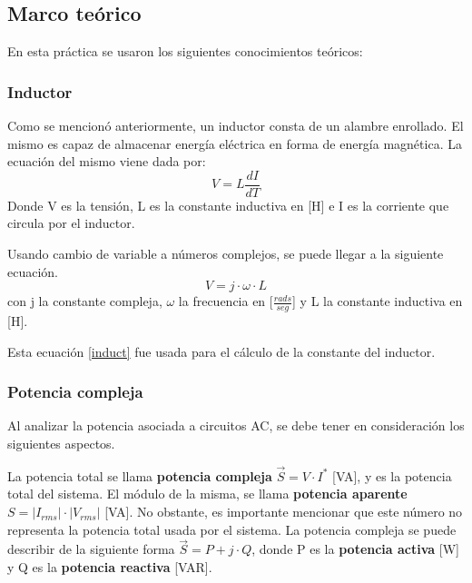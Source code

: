 \documentclass{article}
\begin{document}
        \subsection{Marco teórico}

        En esta práctica se usaron los siguientes conocimientos teóricos:

        \subsubsection{Inductor}

        Como se mencionó anteriormente, un inductor consta de un alambre enrollado. El mismo es capaz de almacenar energía eléctrica en forma de energía magnética.
         La ecuación del mismo viene dada por:
        \begin{equation*}
            V=L \frac{dI}{dT}
        \end{equation*}
        Donde V es la tensión, L es la constante inductiva en [H] e I es la corriente que circula por el inductor.

        Usando cambio de variable a números complejos, se puede llegar a la siguiente ecuación.
        \begin{equation}
            V=j\cdot \omega\cdot L
            \label{induct}
        \end{equation}
        con j la constante compleja, $\omega$ la frecuencia en [$\frac{rads}{seg}$] y L la constante inductiva en [H].\par
        Esta ecuación \eqref{induct} fue usada para el cálculo de la constante del inductor.

        \subsubsection{Potencia compleja}

        Al analizar la potencia asociada a circuitos AC, se debe tener en consideración los siguientes aspectos.\par
        La potencia total se llama { \bfseries potencia compleja} $\vec{S}= V \cdot I^{*}$ [VA], y es la potencia total del sistema. El módulo de la misma, se llama {\bfseries potencia aparente} $S=|I_{rms}| \cdot |V_{rms}|$ [VA]. No obstante, es importante mencionar que este número no representa la potencia total usada por el sistema.
        La potencia compleja se puede describir de la siguiente forma $\vec{S}=P + j \cdot Q$, donde P es la { \bfseries potencia activa}  [W] y Q es la {\bfseries potencia reactiva} [VAR]. \par
\end{document}
